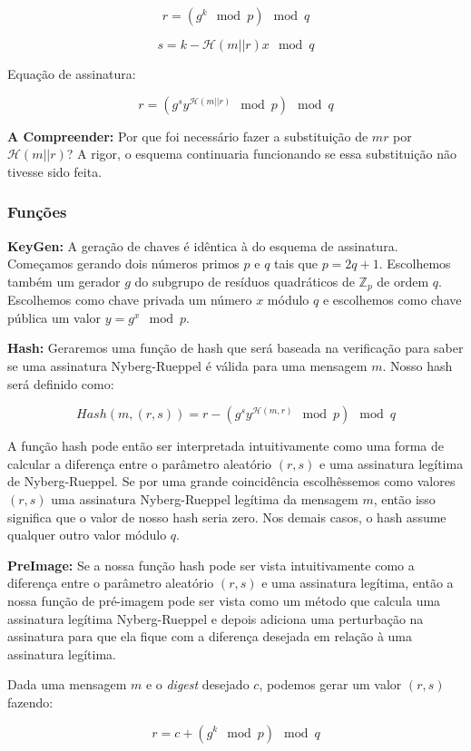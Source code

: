 \documentclass[a4paper]{article}
\begin{document}
$$
r = (g^k \mod p) \mod q
$$

$$
s = k-\mathcal{H}(m||r)x \mod q
$$

Equação de assinatura:

$$
r = (g^sy^{\mathcal{H}(m||r)} \mod p) \mod q
$$

\textbf{A Compreender: }Por que foi necessário fazer a substituição de
$mr$ por $\mathcal{H}(m||r)$? A rigor, o esquema continuaria
funcionando se essa substituição não tivesse sido feita.

\subsubsection{Funções}

\textbf{KeyGen: }A geração de chaves é idêntica à do esquema de
assinatura. Começamos gerando dois números primos $p$ e $q$ tais que
$p=2q+1$. Escolhemos também um gerador $g$ do subgrupo de resíduos
quadráticos de $\mathbb{Z}_p$ de ordem $q$. Escolhemos como chave
privada um número $x$ módulo $q$ e escolhemos como chave pública um
valor $y=g^x \mod p$.

\textbf{Hash: } Geraremos uma função de hash que será baseada na
verificação para saber se uma assinatura Nyberg-Rueppel é válida para
uma mensagem $m$. Nosso hash será definido como:

$$
Hash(m, (r, s)) = r - (g^sy^{\mathcal{H}(m, r)} \mod p) \mod q
$$

A função hash pode então ser interpretada intuitivamente como uma
forma de calcular a diferença entre o parâmetro aleatório $(r, s)$ e
uma assinatura legítima de Nyberg-Rueppel. Se por uma grande
coincidência escolhêssemos como valores $(r, s)$ uma assinatura
Nyberg-Rueppel legítima da mensagem $m$, então isso significa que o
valor de nosso hash seria zero. Nos demais casos, o hash assume
qualquer outro valor módulo $q$.


\textbf{PreImage:} Se a nossa função hash pode ser vista
intuitivamente como a diferença entre o parâmetro aleatório $(r, s)$ e
uma assinatura legítima, então a nossa função de pré-imagem pode ser
vista como um método que calcula uma assinatura legítima
Nyberg-Rueppel e depois adiciona uma perturbação na assinatura para
que ela fique com a diferença desejada em relação à uma assinatura legítima.

Dada uma mensagem $m$ e o \textit{digest} desejado $c$, podemos gerar
um valor $(r, s)$ fazendo:

$$
r = c + (g^k \mod p) \mod q
$$
\end{document}
